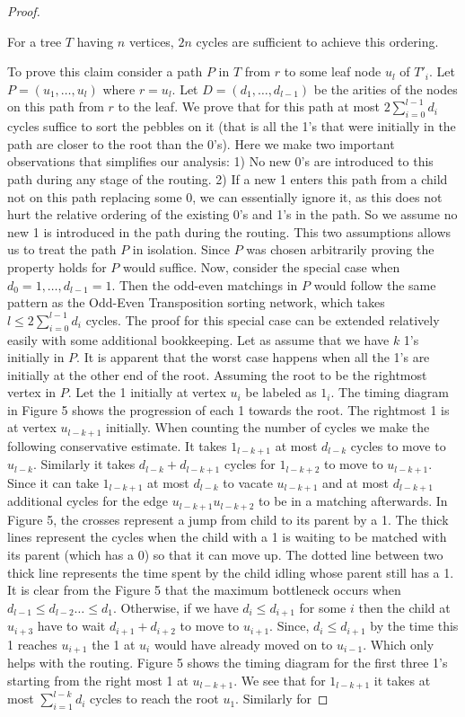 \documentclass[runningheads,a4paper]{llncs}
\begin{document}
\begin{proof}
	\begin{claim}
		For a tree $T$ having $n$ vertices, $2n$ cycles are sufficient to achieve this ordering.
	\end{claim}
	To prove this claim consider a path $P$ in $T$ from $r$ to some leaf node $u_l$ of $T'_i$. Let $P = (u_1,\ldots,u_l)$ where $r=u_l$. Let $D=(d_1,\ldots,d_{l-1})$ be the arities of the nodes on this path from $r$ to the leaf. We prove that for this path at most $2\sum_{i=0}^{l-1}{d_i}$ cycles suffice to sort the pebbles on it (that is all the 1's that were initially in the path are closer to the root than the 0's). Here we make two important observations that simplifies our analysis: 1) No new 0's are introduced to this path during any stage of the routing. 2) If a new 1 enters this path from a child not on this path replacing some 0, we can essentially ignore it, as this does not hurt the relative ordering of the existing 0's and 1's in the path. So we assume no new 1 is introduced in the path during the routing. This two assumptions allows us to treat the path $P$ in isolation. Since $P$ was chosen arbitrarily proving the property holds for $P$ would suffice. Now, consider the special case when $d_0=1,\ldots,d_{l-1}=1$. Then the odd-even matchings in $P$ would follow the same pattern as the Odd-Even Transposition sorting network, which takes $l \le 2\sum_{i=0}^{l-1}{d_i}$ cycles. The proof for this special case can be extended relatively easily with some additional bookkeeping. Let as assume that we have $k$ 1's initially in $P$. It is apparent that the worst case happens when all the 1's are initially at the other end of the root. Assuming the root to be the rightmost vertex in $P$. Let the 1 initially at vertex $u_i$ be labeled as $1_i$. The timing diagram in Figure 5 shows the progression of each 1 towards the root. The rightmost 1 is at vertex $u_{l-k+1}$ initially. When counting the number of cycles we make the following conservative estimate. It takes $1_{l-k+1}$ at most $d_{l-k}$ cycles to move to $u_{l-k}$. Similarly it takes  $d_{l-k}+d_{l-k+1}$ cycles for $1_{l-k+2}$ to move to $u_{l-k+1}$. Since it can take $1_{l-k+1}$ at most $d_{l-k}$ to vacate $u_{l-k+1}$ and at most $d_{l-k+1}$ additional cycles for the edge $u_{l-k+1}u_{l-k+2}$ to be in a matching afterwards. In Figure 5, the crosses represent a jump from child to its parent by a 1. The thick lines represent the cycles when the child with a 1 is waiting to be matched with its parent (which has a 0) so that it can move up. The dotted line between two thick line represents the time spent by the child idling whose parent still has a 1. It is clear from the Figure 5 that the maximum bottleneck occurs when $d_{l-1} \le d_{l-2} \ldots \le d_{1}$. Otherwise, if we have $d_i \le d_{i+1}$ for some $i$ then the child at $u_{i+3}$ have to wait $d_{i+1} + d_{i+2}$ to move to $u_{i+1}$. Since, $d_{i} \le d_{i+1}$ by the time this 1 reaches $u_{i+1}$ the 1 at $u_{i}$ would have already moved on to $u_{i-1}$. Which only helps with the routing. Figure 5 shows the timing diagram for the first three 1's starting from the right most 1 at $u_{l-k+1}$. We see that for $1_{l-k+1}$ it takes at most $\sum_{i=1}^{l-k}{d_i}$ cycles to reach the root $u_1$. Similarly for 
\end{proof}
\end{document}
